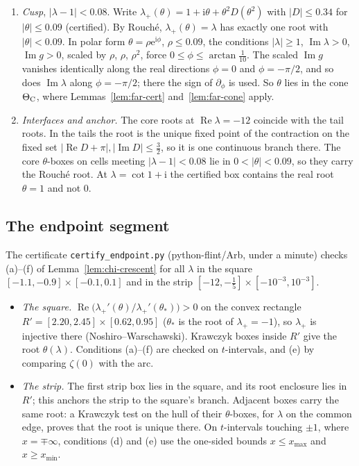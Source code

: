 \documentclass[11pt]{amsart}
\theoremstyle{definition}
\newcommand{\eee}{\mathrm{e}}
\newcommand{\ii}{\mathrm{i}}
\begin{document}
\begin{enumerate}
  $\theta$ reflected in the imaginary axis.
\item[(P)] \emph{Cusp}, $|\lambda-1|<0.08$.  Write $\lambda_+(\theta)=1+\ii\theta+\theta^2D(\theta^2)$ with $|D|\le0.34$ for
  $|\theta|\le0.09$ (certified).  By Rouch\'e, $\lambda_+(\theta)=\lambda$ has exactly one root with $|\theta|<0.09$.  In polar form $\theta=\rho\eee^{\ii\phi}$, $\rho\le0.09$, the conditions
  $|\lambda|\ge1$, $\operatorname{Im}\lambda>0$, $\operatorname{Im}g>0$, scaled by $\rho$, $\rho$, $\rho^2$, force $0\le\phi\le\arctan\tfrac1{10}$.  The
  scaled $\operatorname{Im}g$ vanishes identically along the real directions $\phi=0$ and $\phi=-\pi/2$,
  and so does $\operatorname{Im}\lambda$ along $\phi=-\pi/2$; there the sign of $\partial_\phi$ is used.  So $\theta$ lies in the cone
  $\Theta_{\rm C}$, where Lemmas~\ref{lem:far-cert} and~\ref{lem:far-cone} apply.
\item[(I)] \emph{Interfaces and anchor.}  The core roots at $\operatorname{Re}\lambda=-12$ coincide with the tail
  roots.  In the tails the root is the unique fixed point of the contraction on the
  fixed set $|\operatorname{Re}D+\pi|,|\operatorname{Im}D|\le\tfrac32$, so it is one continuous branch there.  The core
  $\theta$-boxes on cells meeting $|\lambda-1|<0.08$ lie in $0<|\theta|<0.09$, so they carry the Rouch\'e
  root.  At $\lambda=\cot1+\ii$ the certified box contains the real root $\theta=1$ and not $0$.
\end{enumerate}

\subsection{The endpoint segment}\label{app:endpoint}
The certificate \texttt{certify\_endpoint.py} (python-flint/Arb, under a minute)
checks (a)--(f) of Lemma~\ref{lem:chi-crescent} for all $\lambda$ in the square
$[-1.1,-0.9]\times[-0.1,0.1]$ and in the strip $[-12,-\tfrac15]\times[-10^{-3},10^{-3}]$.
\begin{itemize}
\item \emph{The square.}  $\operatorname{Re}\bigl(\lambda_+'(\theta)/\lambda_+'(\theta_*)\bigr)>0$ on the convex rectangle
  $R'=[2.20,2.45]\times[0.62,0.95]$ ($\theta_*$ is the root of $\lambda_+=-1$), so $\lambda_+$ is injective there
  (Noshiro--Warschawski).  Krawczyk boxes inside $R'$ give the root $\theta(\lambda)$.  Conditions
  (a)--(f) are checked on $t$-intervals, and (e) by comparing $\zeta(0)$ with the arc.
\item \emph{The strip.}  The first strip box lies in the square, and its root enclosure lies in
  $R'$; this anchors the strip to the square's branch.  Adjacent boxes carry the same root:
  a Krawczyk test on the hull of their $\theta$-boxes, for $\lambda$ on the common edge, proves that
  the root is unique there.  On $t$-intervals touching $\pm1$, where $x=\mp\infty$, conditions (d) and
  (e) use the one-sided bounds $x\le x_{\max}$ and $x\ge x_{\min}$.
\end{itemize}
\end{document}
